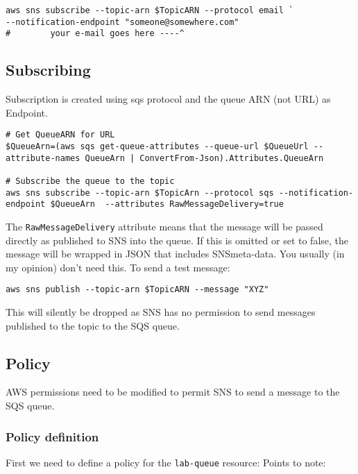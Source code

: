 \begin{verbatim}
aws sns subscribe --topic-arn $TopicARN --protocol email `
--notification-endpoint "someone@somewhere.com"
#        your e-mail goes here ----^
\end{verbatim}

\subsection{Subscribing}\label{subscribing}

Subscription is created using sqs protocol and the queue ARN (not URL) as Endpoint.

\begin{verbatim}
# Get QueueARN for URL
$QueueArn=(aws sqs get-queue-attributes --queue-url $QueueUrl --attribute-names QueueArn | ConvertFrom-Json).Attributes.QueueArn

# Subscribe the queue to the topic
aws sns subscribe --topic-arn $TopicArn --protocol sqs --notification-endpoint $QueueArn  --attributes RawMessageDelivery=true 
\end{verbatim}

The \texttt{RawMessageDelivery} attribute means that the message will be passed directly as published to SNS into the queue.
If this is omitted or set to false, the message will be wrapped in JSON that includes SNSmeta-data.
You usually (in my opinion) don't need this. 
To send a test message:

\begin{verbatim}
aws sns publish --topic-arn $TopicARN --message "XYZ"
\end{verbatim}

This will silently be dropped as SNS has no permission to send messages
published to the topic to the SQS queue.

\subsection{Policy}
\label{policy}

AWS permissions need to be modified to permit SNS to send a message to
the SQS queue.

\subsubsection{Policy definition}\label{policy-definition}

First we need to define a policy for the \texttt{lab-queue} resource:
Points to note:

